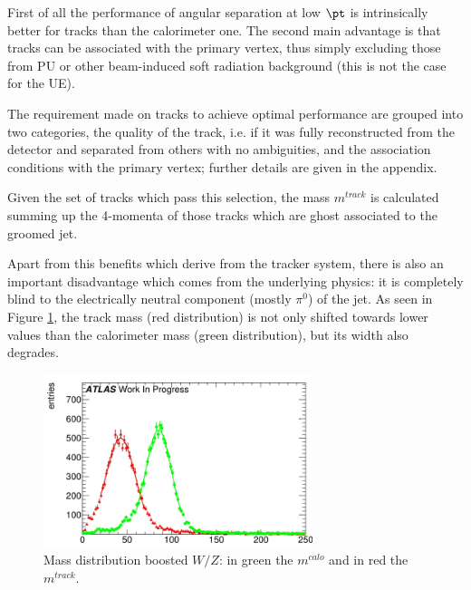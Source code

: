 First of all the performance of angular separation at low $\pt$ is intrinsically better for tracks than the calorimeter one.
The second main advantage is that tracks can be associated with the primary vertex, thus simply excluding those from PU or other beam-induced soft radiation background (this is not the case for the UE).

The requirement made on tracks to achieve optimal performance are grouped into two categories, the quality of the track, i.e. if it was fully reconstructed from the detector and separated from others with no ambiguities, and the association conditions with the primary vertex; further details are given in the appendix.

Given the set of tracks which pass this selection, the mass $m^{track}$ is calculated summing up the 4-momenta of those tracks which are ghost associated to the groomed jet.


Apart from this benefits which derive from the tracker system, there is also an important disadvantage which comes from the underlying physics: it is completely blind to the electrically neutral component (mostly $\pi^0$) of the jet. As seen in Figure \ref{fig:trackandcalo}, the track mass (red distribution) is not only shifted towards lower values than the calorimeter mass (green distribution), but its width also degrades. 

\begin{figure}[!ht]
  \centering
      \includegraphics[width=0.7\textwidth]{jet_part/trackandcalo.png}
  \caption[Mass distribution for boosted $W/Z$]{Mass distribution boosted $W/Z$: in green the $m^{calo}$ and in red the $m^{track}$. }
  \label{fig:trackandcalo}
\end{figure}

